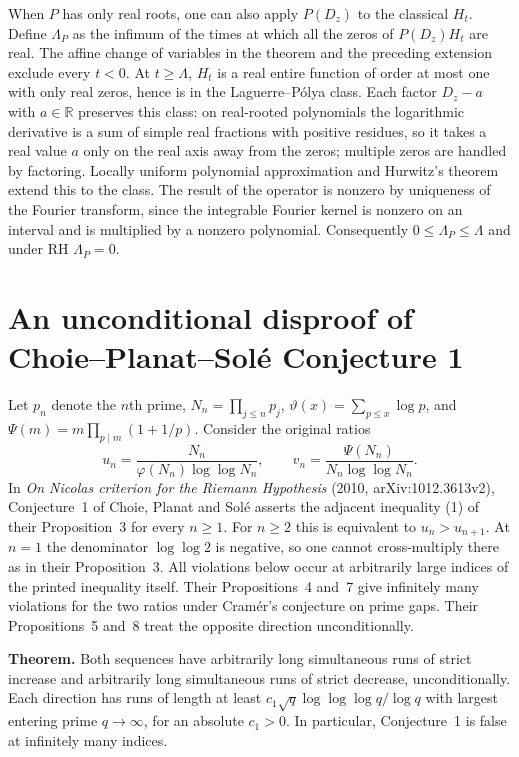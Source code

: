 \documentclass[11pt,a4paper]{article}
\begin{document}
When $P$ has only real roots, one can also apply $P(D_z)$ to the
classical $H_t$. Define $\Lambda_P$ as the infimum of the times at which
all the zeros of $P(D_z)H_t$ are real. The affine change of variables
in the theorem and the preceding extension exclude every $t<0$.
At $t\ge\Lambda$, $H_t$ is a real entire function of order at most one
with only real zeros, hence is in the Laguerre--P\'olya class.
Each factor $D_z-a$ with $a\in\mathbb R$ preserves this class:
on real-rooted polynomials the logarithmic derivative is a sum of
simple real fractions with positive residues, so it takes a real value
$a$ only on the real axis away from the zeros; multiple zeros are
handled by factoring. Locally uniform polynomial approximation and
Hurwitz's theorem extend this to the class. The result of the operator is nonzero by uniqueness of the Fourier
transform, since the integrable Fourier kernel is nonzero on an interval
and is multiplied by a nonzero polynomial.
Consequently $0\le\Lambda_P\le\Lambda$ and under RH $\Lambda_P=0$.

\section{An unconditional disproof of Choie--Planat--Sol\'e Conjecture 1}
Let $p_n$ denote the $n$th prime, $N_n=\prod_{j\le n}p_j$,
$\vartheta(x)=\sum_{p\le x}\log p$,
and $\Psi(m)=m\prod_{p\mid m}(1+1/p)$. Consider the original ratios
\[
 u_n=\frac{N_n}{\varphi(N_n)\log\log N_n},\qquad
 v_n=\frac{\Psi(N_n)}{N_n\log\log N_n}.
\]
In \emph{On Nicolas criterion for the Riemann Hypothesis}
(2010, arXiv:1012.3613v2), Conjecture~1 of Choie, Planat and Sol\'e
\cite{cps} asserts the adjacent inequality (1) of their Proposition~3 for every
$n\ge1$. For $n\ge2$ this is equivalent to $u_n>u_{n+1}$.
At $n=1$ the denominator $\log\log 2$ is negative, so one cannot
cross-multiply there as in their Proposition~3. All violations below
occur at arbitrarily large indices of the printed inequality itself.
Their Propositions~4 and~7 give infinitely many violations for the two
ratios under Cram\'er's conjecture on prime gaps.
Their Propositions~5 and~8 treat the opposite direction unconditionally.

\medskip\noindent\textbf{Theorem.}
Both sequences have arbitrarily long simultaneous runs of strict increase
and arbitrarily long simultaneous runs of strict decrease, unconditionally.
Each direction has runs of length at least
$c_1\sqrt{q}\log\log\log q/\log q$ with largest entering prime
$q\to\infty$, for an absolute $c_1>0$. In particular, Conjecture~1
is false at infinitely many indices.
\end{document}
